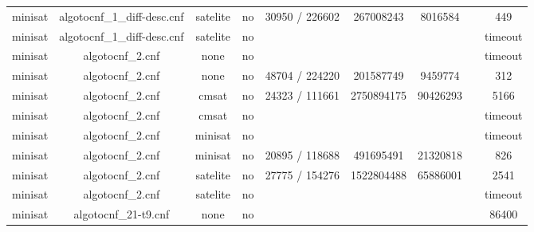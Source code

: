 \begin{appendices}
\begin{table}[p]
\begin{center}
\begin{tabular}{l|cccccccc}
  minisat                        & algotocnf\_1\_diff-desc.cnf    & satelite   & no    & 30950 / 226602 & 267008243 & 8016584   &            & 449 \\ %
  minisat                        & algotocnf\_1\_diff-desc.cnf    & satelite   & no    &            &           &           &            & timeout \\ %
  minisat                        & algotocnf\_2.cnf               & none       & no    &            &           &           &            & timeout \\ %
  minisat                        & algotocnf\_2.cnf               & none       & no    & 48704 / 224220 & 201587749 & 9459774   &            & 312 \\ %
  minisat                        & algotocnf\_2.cnf               & cmsat      & no    & 24323 / 111661 & 2750894175 & 90426293  &            & 5166 \\ %
  minisat                        & algotocnf\_2.cnf               & cmsat      & no    &            &           &           &            & timeout \\ %
  minisat                        & algotocnf\_2.cnf               & minisat    & no    &            &           &           &            & timeout \\ %
  minisat                        & algotocnf\_2.cnf               & minisat    & no    & 20895 / 118688 & 491695491 & 21320818  &            & 826 \\ %
  minisat                        & algotocnf\_2.cnf               & satelite   & no    & 27775 / 154276 & 1522804488 & 65886001  &            & 2541 \\ %
  minisat                        & algotocnf\_2.cnf               & satelite   & no    &            &           &           &            & timeout \\ %
  minisat                        & algotocnf\_21-t9.cnf           & none       & no    &            &           &           &            & 86400 \\ %

\end{tabular}
\end{center}
\end{table}
\end{appendices}
